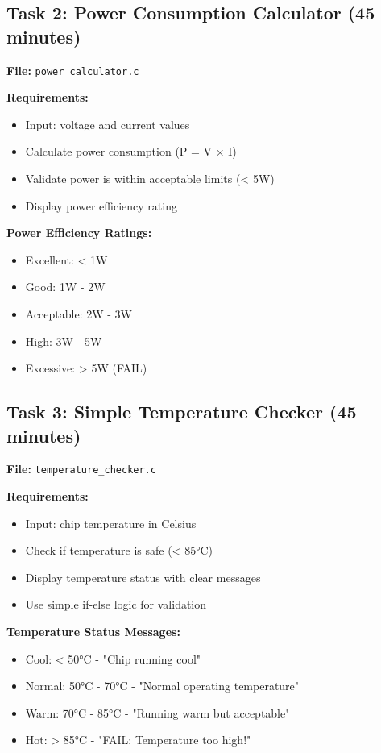 \documentclass[11pt,a4paper]{article}
\begin{document}
\subsection{Task 2: Power Consumption Calculator (45 minutes)}

\textbf{File:} \texttt{power\_calculator.c}

\textbf{Requirements:}
\begin{itemize}
    \item Input: voltage and current values
    \item Calculate power consumption (P = V × I)
    \item Validate power is within acceptable limits (< 5W)
    \item Display power efficiency rating
\end{itemize}

\textbf{Power Efficiency Ratings:}
\begin{itemize}
    \item Excellent: < 1W
    \item Good: 1W - 2W
    \item Acceptable: 2W - 3W
    \item High: 3W - 5W
    \item Excessive: > 5W (FAIL)
\end{itemize}

\subsection{Task 3: Simple Temperature Checker (45 minutes)}

\textbf{File:} \texttt{temperature\_checker.c}

\textbf{Requirements:}
\begin{itemize}
    \item Input: chip temperature in Celsius
    \item Check if temperature is safe (< 85°C)
    \item Display temperature status with clear messages
    \item Use simple if-else logic for validation
\end{itemize}

\textbf{Temperature Status Messages:}
\begin{itemize}
    \item Cool: < 50°C - "Chip running cool"
    \item Normal: 50°C - 70°C - "Normal operating temperature"
    \item Warm: 70°C - 85°C - "Running warm but acceptable"
    \item Hot: > 85°C - "FAIL: Temperature too high!"
\end{itemize}
\end{document}
